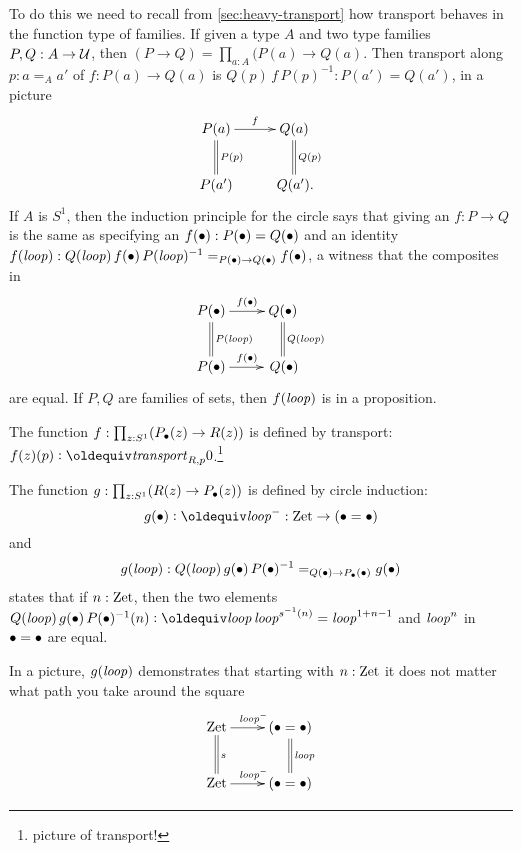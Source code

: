 To do this we need to recall from \cref{sec:heavy-transport} how transport behaves in the function type of families.  If given a type $A$ and two type families $P,Q:A\to\mathcal{U}$, then $(P\to Q)= \prod_{a:A}(P(a)\to Q(a)$.  Then transport along $p:a=_Aa'$ of $f:P(a)\to Q(a)$ is $Q(p)\,f\,P(p)^{-1}:P(a')=Q(a')$, in a picture
$$\xymatrix{
P(a)\ar[r]^{f}\ar@{=}[d]^{P(p)}&Q(a)\ar@{=}[d]^{Q(p)}\\
  P(a')&\,Q(a').}
$$
If $A$ is $S^1$, then the induction principle for the circle says that giving an $f:P\to Q$ is the same as specifying an $f(\bullet):P(\bullet)=Q(\bullet)$ and an identity $f(\mathit{loop}):Q(\mathit{loop})\,f(\bullet)\,P(\mathit{loop})^{-1}=_{P(\bullet)\to Q(\bullet)}f(\bullet)$, \ie a witness that the composites in 
$$\xymatrix{
  P(\base)\ar[r]^{f(\base)}\ar@{=}[d]^{P(\Sloop)}&Q(\base)\ar@{=}[d]^{Q(\Sloop)}\\
  P(\base)\ar[r]^{f(\base)}&\,Q(\base)}
$$
are equal.  If $P,Q$ are families of sets, then $f(\mathit{loop})$ is in a proposition.


\begin{definition}
  \label{def:fPtoR}
  The function $f:\prod_{z:S^1}(P_\bullet(z)\to R(z))$ is defined by transport: $f(z)(p)\defequi\trp_{R,p}0$.\footnote{picture of transport!}
\end{definition}
\begin{definition}
  \label{def:gRtoP}The function $g:\prod_{z:S^1}(R(z)\to P_\bullet(z))$ is defined by circle induction: 
$$g(\base)\defequi \Sloop^-:\zet\to(\base=\base)$$ and 
$$g(\mathit{loop}): Q(\mathit{loop})\, g(\bullet)\,P(\bullet)^{-1}=_{Q(\bullet)\to P_\bullet(\bullet)}g(\bullet)$$ states that if $n:\mathrm{Zet}$, then the two elements $Q(\Sloop)\, g(\base)\,P(\base)^{-1}(n)\defequi \Sloop\,\Sloop^{s^{-1}(n)}=\Sloop^{1+n-1}$ and $\mathit{loop}^n$ in $\bullet=\bullet$ are equal.
\end{definition}
In a picture, $g(\mathit{loop})$ demonstrates that starting with $n:\mathrm{Zet}$ it does not matter what path you take around the square
$$\xymatrix{\zet\ar[r]^{\Sloop^-}\ar@{=}[d]^s&(\base=\base)\ar@{=}[d]^\Sloop\\
  \zet\ar[r]^{\Sloop^-}&(\base=\base)}
$$




